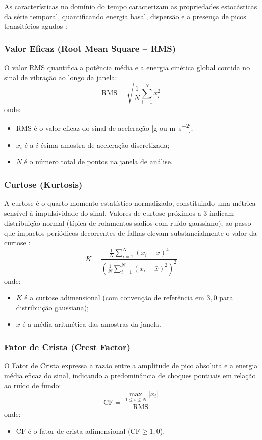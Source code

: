 As características no domínio do tempo caracterizam as propriedades estocásticas da série temporal, quantificando energia basal, dispersão e a presença de picos transitórios agudos \cite{antoni2006spectral}:

\subsubsection{Valor Eficaz (Root Mean Square -- RMS)}
O valor RMS quantifica a potência média e a energia cinética global contida no sinal de vibração ao longo da janela:
\begin{equation}
    \text{RMS} = \sqrt{\frac{1}{N} \sum_{i=1}^{N} x_i^2}
    \label{eq:rms}
\end{equation}
onde:
\begin{itemize}
    \item $\text{RMS}$ é o valor eficaz do sinal de aceleração [\si{g} ou \si{\meter\per\second\squared}];
    \item $x_i$ é a $i$-ésima amostra de aceleração discretizada;
    \item $N$ é o número total de pontos na janela de análise.
\end{itemize}

\subsubsection{Curtose (Kurtosis)}
A curtose é o quarto momento estatístico normalizado, constituindo uma métrica sensível à impulsividade do sinal. Valores de curtose próximos a 3 indicam distribuição normal (típica de rolamentos sadios com ruído gaussiano), ao passo que impactos periódicos decorrentes de falhas elevam substancialmente o valor da curtose \cite{antoni2006spectral}:
\begin{equation}
    K = \frac{\frac{1}{N} \sum_{i=1}^{N} (x_i - \bar{x})^4}{\left( \frac{1}{N} \sum_{i=1}^{N} (x_i - \bar{x})^2 \right)^2}
    \label{eq:curtose}
\end{equation}
onde:
\begin{itemize}
    \item $K$ é a curtose adimensional (com convenção de referência em $3,0$ para distribuição gaussiana);
    \item $\bar{x}$ é a média aritmética das amostras da janela.
\end{itemize}

\subsubsection{Fator de Crista (Crest Factor)}
O Fator de Crista expressa a razão entre a amplitude de pico absoluta e a energia média eficaz do sinal, indicando a predominância de choques pontuais em relação ao ruído de fundo:
\begin{equation}
    \text{CF} = \frac{\max_{1 \le i \le N} |x_i|}{\text{RMS}}
    \label{eq:fator_crista}
\end{equation}
onde:
\begin{itemize}
    \item $\text{CF}$ é o fator de crista adimensional ($\text{CF} \ge 1,0$).
\end{itemize}


